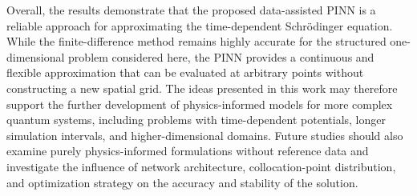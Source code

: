 \documentclass[11pt]{article}
\begin{document}
Overall, the results demonstrate that the proposed data-assisted PINN is a reliable approach for 
approximating the time-dependent Schrödinger equation. While the finite-difference method remains 
highly accurate for the structured one-dimensional problem considered here, the PINN provides a 
continuous and flexible approximation that can be evaluated at arbitrary points without constructing a 
new spatial grid. The ideas presented in this work may therefore support the further development of 
physics-informed models for more complex quantum systems, including problems with time-dependent 
potentials, longer simulation intervals, and higher-dimensional domains. Future studies should also 
examine purely physics-informed formulations without reference data and investigate the influence of 
network architecture, collocation-point distribution, and optimization strategy on the accuracy and 
stability of the solution.


\printbibliography
\end{document}
